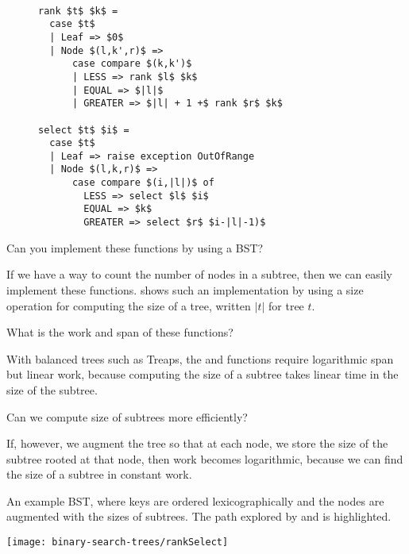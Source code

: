 \begin{figure}
\begin{algorithm}[Rank]~
\begin{lstlisting}
rank $t$ $k$ =
  case $t$ 
  | Leaf => $0$
  | Node $(l,k',r)$ =>
      case compare $(k,k')$ 
      | LESS => rank $l$ $k$
      | EQUAL => $|l|$
      | GREATER => $|l| + 1 +$ rank $r$ $k$

select $t$ $i$ =
  case $t$ 
  | Leaf => raise exception OutOfRange
  | Node $(l,k,r)$ =>
      case compare $(i,|l|)$ of
        LESS => select $l$ $i$
        EQUAL => $k$
        GREATER => select $r$ $i-|l|-1)$
\end{lstlisting}

\label{alg:bst::augment::size}
\label{alg:bst::augment::select}
\label{alg:bst::augment::rank}
\end{algorithm}
\end{figure}

\begin{question}
Can you implement these functions by using a BST? 
\end{question}
If we have a way to count the number of nodes in a subtree, then we
can easily implement these functions.
%
 shows such an implementation by using a
size operation for computing the size of a tree, written $|t|$ for
tree $t$.
%
\begin{question}
What is the work and span of these functions?
\end{question}
%
With balanced trees such as Treaps, the  and 
functions require logarithmic span but linear work, because computing
the size of a subtree takes linear time in the size of the subtree.
%
\begin{question}
Can we compute size of subtrees more efficiently? 
\end{question}
%
If, however, we augment the tree so that at each node, we store the
size of the subtree rooted at that node, then work becomes
logarithmic, because we can find the size of a subtree in constant
work.

\begin{example}
An example BST, where keys are ordered lexicographically and the nodes
are augmented with the sizes of subtrees.
%
The path explored by  and  is
highlighted.

\begin{center}
  \texttt{[image: binary-search-trees/rankSelect]}
\end{center}
\end{example}


